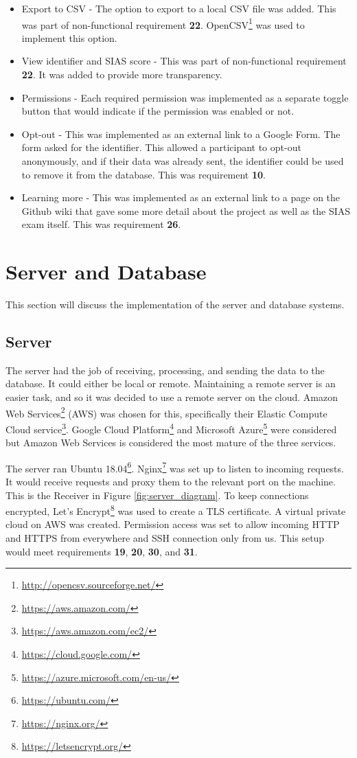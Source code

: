 \documentclass{l4proj}
\begin{document}
\begin{itemize}
    \item Export to CSV - The option to export to a local CSV file was added. This was part of non-functional requirement \textbf{22}. OpenCSV\footnote{\url{http://opencsv.sourceforge.net/}} was used to implement this option.
    \item View identifier and SIAS score - This was part of non-functional requirement \textbf{22}. It was added to provide more transparency.
    \item Permissions - Each required permission was implemented as a separate toggle button that would indicate if the permission was enabled or not.
    \item Opt-out - This was implemented as an external link to a Google Form. The form asked for the identifier. This allowed a participant to opt-out anonymously, and if their data was already sent, the identifier could be used to remove it from the database. This was requirement \textbf{10}.
    \item Learning more - This was implemented as an external link to a page on the Github wiki that gave some more detail about the project as well as the SIAS exam itself. This was requirement \textbf{26}.
\end{itemize}


\section{Server and Database}\label{section:server-db-impl}
This section will discuss the implementation of the server and database systems.

\subsection{Server}
The server had the job of receiving, processing, and sending the data to the database. It could either be local or remote. Maintaining a remote server is an easier task, and so it was decided to use a remote server on the cloud. Amazon Web Services\footnote{\url{https://aws.amazon.com/}} (AWS) was chosen for this, specifically their Elastic Compute Cloud service\footnote{\url{https://aws.amazon.com/ec2/}}. Google Cloud Platform\footnote{\url{https://cloud.google.com/}} and Microsoft Azure\footnote{\url{https://azure.microsoft.com/en-us/}} were considered but Amazon Web Services is considered the most mature of the three services.

The server ran Ubuntu 18.04\footnote{\url{https://ubuntu.com/}}.  Nginx\footnote{\url{https://nginx.org/}} was set up to listen to incoming requests. It would receive requests and proxy them to the relevant port on the machine. This is the Receiver in Figure \ref{fig:server_diagram}. To keep connections encrypted, Let's Encrypt\footnote{\url{https://letsencrypt.org/}} was used to create a TLS certificate. A virtual private cloud on AWS was created. Permission access was set to allow incoming HTTP and HTTPS from everywhere and SSH connection only from us. This setup would meet requirements \textbf{19}, \textbf{20}, \textbf{30}, and \textbf{31}.
\end{document}
